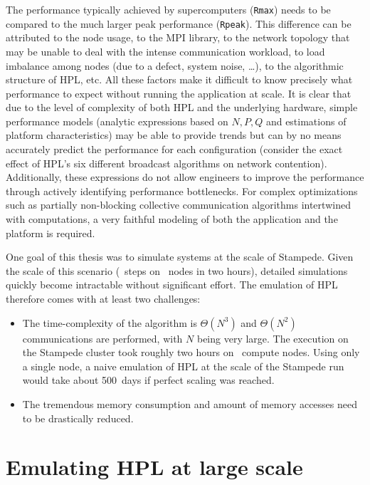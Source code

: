         The performance typically achieved by supercomputers (\texttt{Rmax}) needs to be compared to the much larger
        peak performance (\texttt{Rpeak}). This difference can be attributed to the node usage, to the MPI library, to
        the network topology that may be unable to deal with the intense communication workload, to load imbalance among
        nodes (\eg due to a defect, system noise, \ldots), to the algorithmic structure of HPL, etc. All these factors
        make it difficult to know precisely what performance to expect without running the application at scale.  It is
        clear that due to the level of complexity of both HPL and the underlying hardware, simple performance models
        (analytic expressions based on $N, P, Q$ and estimations of platform characteristics) may be able to provide
        trends but can by no means accurately predict the performance for each configuration (\eg consider the exact
        effect of HPL's six different broadcast algorithms on network contention). Additionally, these expressions do
        not allow engineers to improve the performance through actively identifying performance bottlenecks.  For
        complex optimizations such as partially non-blocking collective communication algorithms intertwined with
        computations, a very faithful modeling of both the application and the platform is required.

        One goal of this thesis was to simulate systems at the scale of Stampede. Given the scale of this scenario
        (~steps on ~nodes in two hours), detailed simulations quickly become intractable without
        significant effort. The emulation of HPL therefore comes with at least two challenges:
        \begin{itemize}
            \item The time-complexity of the algorithm is \(\Theta(N^3)\) and \(\Theta(N^2)\) communications are
                performed, with \(N\) being very large. The execution on the Stampede cluster took roughly two hours on
                ~compute nodes. Using only a single node, a naive emulation of HPL at the scale of the
                Stampede run would take about 500 days if perfect scaling was reached.
            \item The tremendous memory consumption and amount of memory accesses need to be drastically reduced.
        \end{itemize}

\chapter{Emulating HPL at large scale}%
\label{chapter:prediction:emulation}

